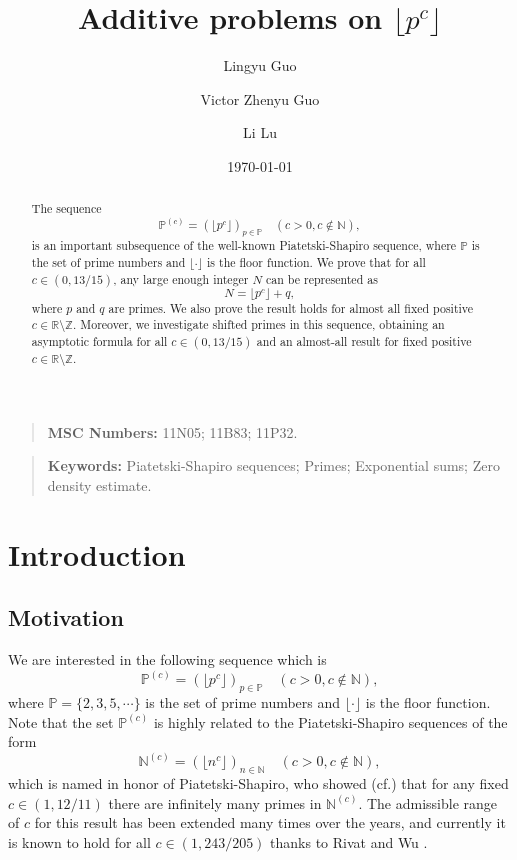 \documentclass[12pt, reqno, twoside, letterpaper]{amsart}
\title[Additive problems on $\lfloor p^c \rfloor$]
{Additive problems on $\lfloor p^c \rfloor$}
\author[Lingyu Guo]{Lingyu Guo}
\author[Victor Zhenyu Guo]{Victor Zhenyu Guo}
\author[Li Lu]{Li Lu}
\date{\today}
\numberwithin{equation}{section}
\newcommand{\NN}{\ensuremath{\mathbb{N}}}
\newcommand{\PP}{\ensuremath{\mathbb{P}}}
\theoremstyle{customthm}
\theoremstyle{customrem}
\begin{document}
	
\begin{abstract}

The sequence
$$
\mathbb{P}^{(c)}=(\lfloor p^c \rfloor)_{p\in \mathbb{P}}\quad (c>0,c\notin \mathbb{N}),
$$
is an important subsequence of the well-known Piatetski-Shapiro sequence, where $\PP$ is the set of prime numbers and $\lfloor \cdot \rfloor$ is the floor function. We prove that for all $c \in (0, 13/15)$, any large enough integer $N$ can be represented as
	$$
	N=\lfloor p^c\rfloor+q,
	$$
where $p$ and $q$ are primes. We also prove the result holds for almost all fixed positive $c \in \mathbb{R}\setminus\mathbb{Z}$. Moreover, we investigate shifted primes in this sequence, obtaining an asymptotic formula for all $c \in (0, 13/15)$ and an almost-all result for fixed positive $c \in \mathbb{R}\setminus\mathbb{Z}$. 

	
\end{abstract}
	
\maketitle
	
\begin{quote}
\textbf{MSC Numbers:} 11N05; 11B83; 11P32.
\end{quote}
	
	
\begin{quote}
\textbf{Keywords:} Piatetski-Shapiro sequences; Primes; Exponential sums; Zero density estimate. 
\end{quote}
	
\section{Introduction}
\subsection{Motivation}
We are interested in the following sequence which is 
$$
\PP^{(c)}=(\lfloor p^c \rfloor)_{p\in \mathbb{P}}\quad (c>0,c\notin \NN),
$$
where $\PP=\{2,3,5,\cdots\}$ is the set of prime numbers and $\lfloor \cdot \rfloor$ is the floor function. Note that the set $\mathbb{P}^{(c)}$ is highly related to the Piatetski-Shapiro sequences of the form
$$
\NN^{(c)}=(\lfloor n^c \rfloor)_{n\in \mathbb{N}}\quad (c>0,c\notin \NN),
$$
which is named in honor of Piatetski-Shapiro, who showed (cf.\cite{PS}) that for any fixed $c \in (1, 12/11)$ there are infinitely many primes in $\NN^{(c)}$. The admissible range of $c$ for this result has been extended many times over the years, and currently it is known to hold for all $c \in (1, 243/205)$ thanks to Rivat and Wu \cite{J.Wu}.
\end{document}
